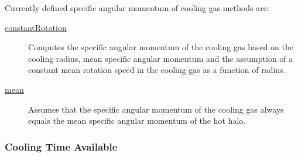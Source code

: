 Currently defined specific angular momentum of cooling gas methods are:
\begin{description}
 \item [\hyperlink{cooling.specific_angular_momentum.constant_rotation.F90:cooling_specific_angular_momenta_constant_rotation:cooling_specific_angular_momentum_constant_rotation}{{\normalfont \ttfamily constantRotation}}] Computes the specific angular momentum of the cooling gas based on the cooling radius, mean specific angular momentum and the assumption of a constant mean rotation speed in the cooling gas as a function of radius.
 \item [\hyperlink{cooling.specific_angular_momentum.mean.F90:cooling_specific_angular_momenta_mean:cooling_specific_angular_momentum_mean}{{\normalfont \ttfamily mean}}] Assumes that the specific angular momentum of the cooling gas always equals the mean specific angular momentum of the hot halo.
\end{description}

\subsubsection{Cooling Time Available}

